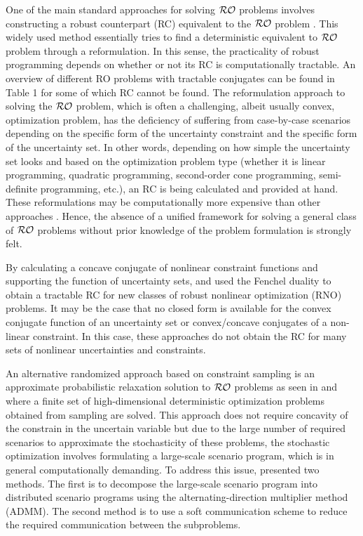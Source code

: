 \documentclass[journal,twoside,web]{ieeecolor}
\begin{document}
One of the main standard approaches for solving ${\cal RO}$ problems involves constructing a robust counterpart (RC) equivalent to the ${\cal RO}$ problem \cite{bental2009}. This widely used method essentially tries to find a deterministic equivalent to ${\cal RO}$ problem through a reformulation. In this sense, the practicality of robust programming depends on whether or not its RC is computationally tractable. An overview of different RO problems with tractable conjugates can be found in \cite{gorissen20152} Table 1 for some of which RC cannot be found. 
The reformulation approach to solving the ${\cal RO}$ problem, which is often a challenging, albeit usually convex, optimization problem, has the deficiency of suffering from case-by-case scenarios depending on the specific form of the uncertainty constraint and the specific form of the uncertainty set. In other words, depending on how simple the uncertainty set looks and based on the optimization problem type (whether it is linear programming, quadratic programming, second-order cone programming, semi-definite programming, etc.), an RC is being calculated and provided at hand. These reformulations may be computationally more expensive than other approaches \cite{bertsimas2016}. Hence, the absence of a unified framework for solving a general class of ${\cal RO}$ problems without prior knowledge of the problem formulation is strongly felt.

By calculating a concave conjugate of nonlinear constraint functions and supporting the function of uncertainty sets, \cite{bental20152} and \cite{gorissen20152} used the Fenchel duality to obtain a tractable RC for new classes of robust nonlinear optimization (RNO) problems. It may be the case that no closed form is available for the convex conjugate function of an uncertainty set or convex/concave conjugates of a non-linear constraint. In this case, these approaches do not obtain the RC for many sets of nonlinear uncertainties and constraints.

An alternative randomized approach based on constraint sampling is an approximate probabilistic relaxation solution to ${\cal RO}$ problems as seen in \cite{calafiore2004} and \cite{calafiore2010} where a finite set of high-dimensional deterministic optimization problems obtained from sampling are solved. This approach does not require concavity of the constrain in the uncertain variable but due to the large number of required scenarios to approximate the stochasticity of these problems, the stochastic optimization involves formulating a large-scale scenario program, which is in general computationally demanding. To address this issue, \cite{rostampour2021} presented two methods. The first is to decompose the large-scale scenario program into distributed scenario programs using the alternating-direction multiplier method (ADMM). The second method is to use a soft communication scheme to reduce the required communication between the subproblems.
\end{document}

